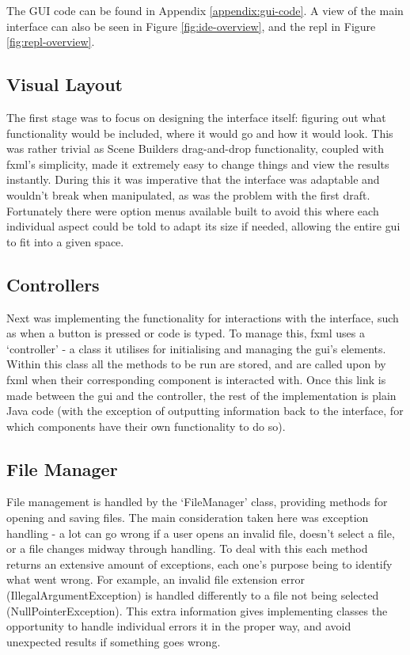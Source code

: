 \documentclass[
]{report}
\begin{document}
The GUI code can be found in Appendix \ref{appendix:gui-code}. A view of the
main interface can also be seen in Figure \ref{fig:ide-overview}, and the
\acrshort{repl} in Figure \ref{fig:repl-overview}.

\subsection{Visual Layout}
The first stage was to focus on designing the interface itself: figuring
out what functionality would be included, where it would go and how it
would look. This was rather trivial as Scene Builders drag-and-drop
functionality, coupled with \acrshort{fxml}'s simplicity, made it extremely easy to
change things and view the results instantly. During this it was
imperative that the interface was adaptable and wouldn't break when
manipulated, as was the problem with the first draft. Fortunately there
were option menus available built to avoid this where each individual
aspect could be told to adapt its size if needed, allowing the entire
\acrshort{gui} to fit into a given space.

\subsection{Controllers}
Next was implementing the functionality for interactions with the
interface, such as when a button is pressed or code is typed. To manage
this, \acrshort{fxml} uses a `controller' - a class it utilises for initialising and
managing the \acrshort{gui}'s elements. Within this class all the methods to be run
are stored, and are called upon by \acrshort{fxml} when their corresponding
component is interacted with. Once this link is made between the \acrshort{gui} and
the controller, the rest of the implementation is plain Java code (with
the exception of outputting information back to the interface, for which
components have their own functionality to do so).

\subsection{File Manager}
File management is handled by the `FileManager' class, providing methods
for opening and saving files. The main consideration taken here was
exception handling - a lot can go wrong if a user opens an invalid file,
doesn't select a file, or a file changes midway through handling. To
deal with this each method returns an extensive amount of exceptions,
each one's purpose being to identify what went wrong. For example, an
invalid file extension error (IllegalArgumentException) is handled
differently to a file not being selected (NullPointerException). This
extra information gives implementing classes the opportunity to handle
individual errors it in the proper way, and avoid unexpected results if
something goes wrong.
\end{document}
